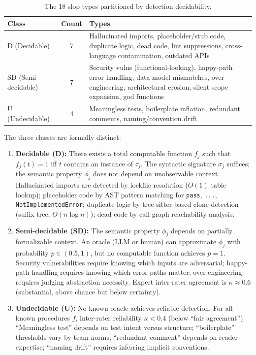 \documentclass[11pt, a4paper, logo, copyright]{googledeepmind}
\begin{document}
\begin{table}[htbp]
\centering
\caption{The 18 slop types partitioned by detection decidability.}
\label{tab:slop-partition}
\small
\begin{tabularx}{\textwidth}{l c X}
\toprule
\textbf{Class} & \textbf{Count} & \textbf{Types} \\
\midrule
D (Decidable) & 7 & Hallucinated imports, placeholder/stub code, duplicate logic, dead code, lint suppressions, cross-language contamination, outdated APIs \\
\addlinespace
SD (Semi-decidable) & 7 & Security vulns (functional-looking), happy-path error handling, data model mismatches, over-engineering, architectural erosion, silent scope expansion, god functions \\
\addlinespace
U (Undecidable) & 4 & Meaningless tests, boilerplate inflation, redundant comments, naming/convention drift \\
\bottomrule
\end{tabularx}
\end{table}

The three classes are formally distinct:

\begin{enumerate}
    \item \textbf{Decidable (D):} There exists a total computable function $f_j$ such that $f_j(t) = 1$ iff $t$ contains an instance of $\tau_j$. The syntactic signature $\sigma_j$ suffices; the semantic property $\phi_j$ does not depend on unobservable context. Hallucinated imports are detected by lockfile resolution ($O(1)$ table lookup); placeholder code by AST pattern matching for \texttt{pass}, \texttt{...}, \texttt{NotImplementedError}; duplicate logic by tree-sitter-based clone detection (suffix tree, $O(n \log n)$); dead code by call graph reachability analysis.

    \item \textbf{Semi-decidable (SD):} The semantic property $\phi_j$ depends on partially formalizable context. An oracle (LLM or human) can approximate $\phi_j$ with probability $p \in (0.5, 1)$, but no computable function achieves $p = 1$. Security vulnerabilities require knowing which inputs are adversarial; happy-path handling requires knowing which error paths matter; over-engineering requires judging abstraction necessity. Expert inter-rater agreement is $\kappa \approx 0.6$ (substantial, above chance but below certainty).

    \item \textbf{Undecidable (U):} No known oracle achieves reliable detection. For all known procedures $f$, inter-rater reliability $\kappa < 0.4$ (below ``fair agreement''). ``Meaningless test'' depends on test intent versus structure; ``boilerplate'' thresholds vary by team norms; ``redundant comment'' depends on reader expertise; ``naming drift'' requires inferring implicit conventions.
\end{enumerate}
\end{document}
